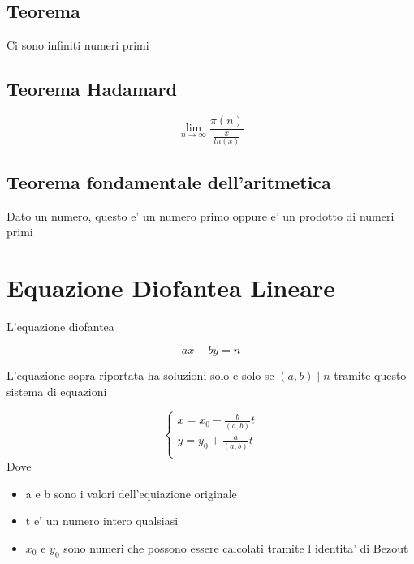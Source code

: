\documentclass{article}
\begin{document}
  \subsection*{Teorema}
  \begin{flushleft}
    Ci sono infiniti numeri primi
  \end{flushleft}
  \subsection*{Teorema Hadamard}
  \begin{equation*}
    \lim_{n \to \infty} \frac{\pi(n)}{\frac{x}{ln(x)}}
  \end{equation*}
  \subsection{Teorema fondamentale dell'aritmetica}
  \begin{flushleft}
    Dato un numero, questo e' un numero primo oppure e' un prodotto di numeri primi
  \end{flushleft}
  \section{Equazione Diofantea Lineare}
  \begin{flushleft}
    L'equazione diofantea 
  \end{flushleft}
  \begin{equation*}
    ax+by=n
  \end{equation*}
  \begin{flushleft}
    L'equazione sopra riportata ha soluzioni solo e solo se $(a,b)\mid n$ tramite questo sistema di equazioni
  \end{flushleft}
  \begin{equation*}
    \begin{cases}
      x=x_0-\frac{b}{(a,b)}t \\
      y=y_0+\frac{a}{(a,b)}t \\
    \end{cases}
  \end{equation*}
  Dove
  \begin{itemize}
    \item a e b sono i valori dell'equiazione originale
    \item t e' un numero intero qualsiasi
    \item $x_0$ e $y_0$ sono numeri che possono essere calcolati tramite l identita' di Bezout
  \end{itemize}
\end{document}
